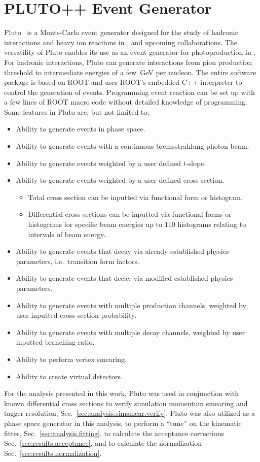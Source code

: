 \section{PLUTO++ Event Generator}\label{sec:pluto}

Pluto~\cite{PLUTO} is a Monte-Carlo event generator designed for the study of hadronic interactions and heavy ion reactions in ,  and upcoming  collaborations. The versatility of Pluto enables its use as an event generator for photoproduction in . For hadronic interactions, Pluto can generate interactions from pion production threshold to intermediate energies of a few~GeV per nucleon. The entire software package is based on ROOT and uses ROOT's embedded C++ interpreter to control the generation of events. Programming event reaction can be set up with a few lines of ROOT macro code without detailed knowledge of programming. Some features in Pluto are, but not limited to;
\begin{itemize}
\item Ability to generate events in phase space.
\item Ability to generate events with a continuous bremsstrahlung photon beam.
\item Ability to generate events weighted by a user defined $t$-slope.
\item Ability to generate events weighted by a user defined cross-section.
\begin{itemize}
\item Total cross section can be inputted via functional form or histogram.
\item Differential cross sections can be inputted via functional forms or histograms for specific beam energies up to 110 histograms relating to intervals of beam energy.
\end{itemize}
\item Ability to generate events that decay via already established physics parameters, i.e.~transition form factors.
\item Ability to generate events that decay via modified established physics parameters.
\item Ability to generate events with multiple production channels, weighted by user inputted cross-section probability.
\item Ability to generate events with multiple decay channels, weighted by user inputted branching ratio.
\item Ability to perform vertex smearing.
\item Ability to create virtual detectors.
\end{itemize}

For the analysis presented in this work, Pluto was used in conjunction with known differential cross sections to verify simulation momentum smearing and tagger resolution, Sec.~\ref{sec:analysis.simsmear.verify}. Pluto was also utilized as a phase space generator in this analysis, to perform a ``tune'' on the kinematic fitter, Sec.~\ref{sec:analysis.fitting}, to calculate the acceptance corrections Sec.~\ref{sec:results.acceptance}, and to calculate the normalization Sec.~\ref{sec:results.normalization}.